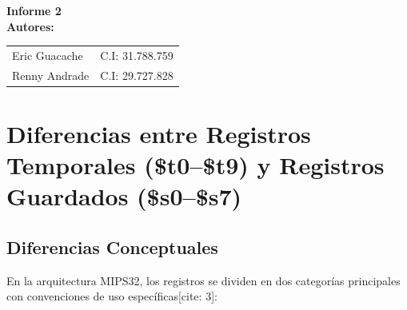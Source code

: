 \documentclass[12pt,a4paper]{article}
\begin{document}
\begin{titlepage}
    \centering
    \vspace*{6cm}
    
    {\Huge \bfseries Informe 2} \\[3cm]
    
    {\Large \bfseries Autores:} \\[0.5cm]
    \begin{tabular}{ll}
        Eric Guacache & C.I: 31.788.759 \\
        Renny Andrade & C.I: 29.727.828
    \end{tabular}
    
    \vfill
\end{titlepage}

\newpage

\tableofcontents
\newpage


\section{Diferencias entre Registros Temporales (\$t0--\$t9) y Registros Guardados (\$s0--\$s7)}

\subsection{Diferencias Conceptuales}
En la arquitectura MIPS32, los registros se dividen en dos categorías principales con convenciones de uso específicas[cite: 3]:
\end{document}

